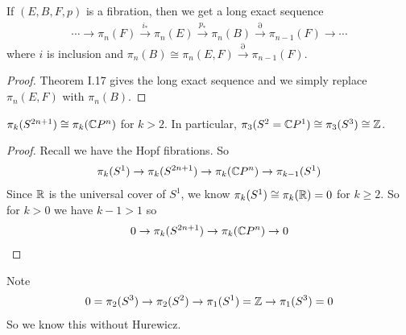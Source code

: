 \documentclass[12pt,class=article,crop=false]{standalone}
\begin{document}
\begin{coro}
If $ (E,B,F,p)$ is a fibration, then we get a long exact sequence
 \begin{align*}
	\cdots \to \pi_n(F) \xrightarrow{ i_*} \pi_n(E) \xrightarrow{ p_*} \pi_n(B) \xrightarrow{ \partial } \pi_{n-1} (F) \to \cdots   
\end{align*}
where $ i$ is inclusion and  $ \pi_n(B) \cong \pi_n(E,F) \xrightarrow{ \partial } \pi_{n-1}(F) $.
\end{coro}
\begin{proof}
Theorem I.17 gives the long exact sequence and we simply replace $ \pi_n(E,F)$ with $ \pi_n(B)$.
\end{proof}

\begin{coro}
$ \pi_k(S^{2n+1}) \cong \pi_k( \mathbb{C} P^{n})$ for $ k>2$. In particular,  $ \pi_3(S^2= \mathbb{C} P^{1}) \cong \pi_3(S^3) \cong \mathbb{Z}$.
\end{coro}
\begin{proof}
Recall we have the Hopf fibrations. So
\begin{align*}
	\pi_k(S^{1}) \to \pi_k(S^{2n+1}) \to \pi_k( \mathbb{C} P^{n}) \to \pi_{k-1}(S^{1})
\end{align*}
Since $ \mathbb{R}$ is the universal cover of $ S^{1}$, we know $ \pi_k(S^{1}) \cong \pi_k(\mathbb{R}) = 0$ for $ k\geq 2$. So for  $ k>0$ we have  $ k-1 >1$ so
 \begin{align*}
	0 \to \pi_k(S^{2n+1}) \to \pi_k( \mathbb{C} P^{n}) \to 0
\end{align*}
\end{proof}
Note
\begin{align*}
	0= \pi_2(S^3) \to \pi_2(S^2) \to \pi_1(S^{1}) = \mathbb{Z} \to \pi_1(S^3) =0
\end{align*}
So we know this without Hurewicz.
\end{document}
